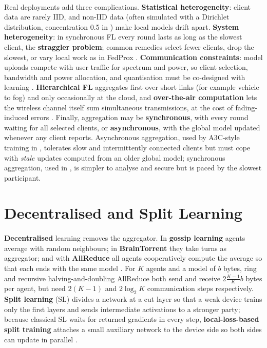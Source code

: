 \documentclass[12pt,a4paper,final]{extreport}
\begin{document}
\paragraph{} Real deployments add three complications. \textbf{Statistical heterogeneity}: client data are rarely IID, and non-IID data (often simulated with a Dirichlet distribution, concentration 0.5 in \cite{p4}) make local models drift apart. \textbf{System heterogeneity}: in synchronous FL every round lasts as long as the slowest client, the \textbf{straggler problem}; common remedies select fewer clients, drop the slowest, or vary local work as in FedProx \cite{p4}. \textbf{Communication constraints}: model uploads compete with user traffic for spectrum and power, so client selection, bandwidth and power allocation, and quantisation must be co-designed with learning \cite{p3}. \textbf{Hierarchical FL} aggregates first over short links (for example vehicle to fog) and only occasionally at the cloud, and \textbf{over-the-air computation} lets the wireless channel itself sum simultaneous transmissions, at the cost of fading-induced errors \cite{p1,p3}. Finally, aggregation may be \textbf{synchronous}, with every round waiting for all selected clients, or \textbf{asynchronous}, with the global model updated whenever any client reports. Asynchronous aggregation, used by A3C-style training in \cite{p1}, tolerates slow and intermittently connected clients but must cope with \emph{stale} updates computed from an older global model; synchronous aggregation, used in \cite{p2}, is simpler to analyse and secure but is paced by the slowest participant.

\section{Decentralised and Split Learning}

\paragraph{} \textbf{Decentralised} learning removes the aggregator. In \textbf{gossip learning} agents average with random neighbours; in \textbf{BrainTorrent} they take turns as aggregator; and with \textbf{AllReduce} all agents cooperatively compute the average so that each ends with the same model \cite{p4}. For $K$ agents and a model of $b$ bytes, ring and recursive halving-and-doubling AllReduce both send and receive $2\frac{K-1}{K}b$ bytes per agent, but need $2(K-1)$ and $2\log_2K$ communication steps respectively. \textbf{Split learning} (SL) divides a network at a cut layer so that a weak device trains only the first layers and sends intermediate activations to a stronger party; because classical SL waits for returned gradients in every step, \textbf{local-loss-based split training} attaches a small auxiliary network to the device side so both sides can update in parallel \cite{p4}.
\end{document}
